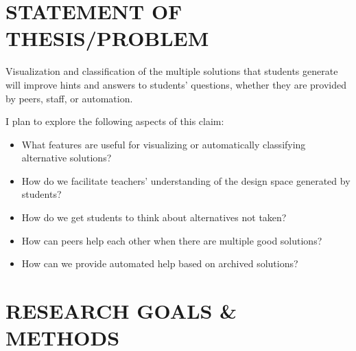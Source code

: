 \documentclass[12pt]{article}
\begin{document}
\section{STATEMENT OF THESIS/PROBLEM}

Visualization and classification of the multiple solutions that students generate will improve hints and answers to students' questions, whether they are provided by peers, staff, or automation. 

I plan to explore the following aspects of this claim:
\begin{itemize}

\item What features are useful for visualizing or automatically classifying alternative solutions?

\item How do we facilitate teachers' understanding of the design space generated by students?

\item How do we get students to think about alternatives not taken?

\item How can peers help each other when there are multiple good solutions?

\item How can we provide automated help based on archived solutions?

\end{itemize}


\section{RESEARCH GOALS \& METHODS}
\end{document}
